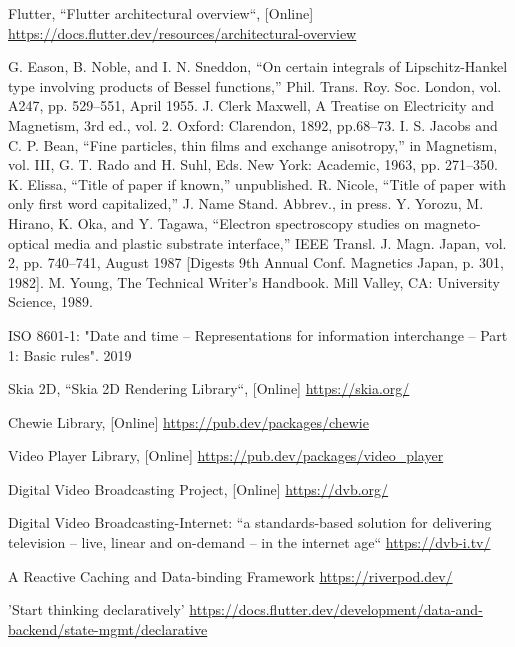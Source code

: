\documentclass[conference]{IEEEtran}
\begin{document}
\begin{thebibliography}{00}
 Flutter, ``Flutter architectural overview``, [Online] \url{https://docs.flutter.dev/resources/architectural-overview}
	
 G. Eason, B. Noble, and I. N. Sneddon, ``On certain integrals of Lipschitz-Hankel type involving products of Bessel functions,'' Phil. Trans. Roy. Soc. London, vol. A247, pp. 529--551, April 1955.
 J. Clerk Maxwell, A Treatise on Electricity and Magnetism, 3rd ed., vol. 2. Oxford: Clarendon, 1892, pp.68--73.
 I. S. Jacobs and C. P. Bean, ``Fine particles, thin films and exchange anisotropy,'' in Magnetism, vol. III, G. T. Rado and H. Suhl, Eds. New York: Academic, 1963, pp. 271--350.
 K. Elissa, ``Title of paper if known,'' unpublished.
 R. Nicole, ``Title of paper with only first word capitalized,'' J. Name Stand. Abbrev., in press.
 Y. Yorozu, M. Hirano, K. Oka, and Y. Tagawa, ``Electron spectroscopy studies on magneto-optical media and plastic substrate interface,'' IEEE Transl. J. Magn. Japan, vol. 2, pp. 740--741, August 1987 [Digests 9th Annual Conf. Magnetics Japan, p. 301, 1982].
 M. Young, The Technical Writer's Handbook. Mill Valley, CA: University Science, 1989.


 ISO 8601-1: "Date and time -- Representations for information interchange -- Part 1: Basic rules". 2019




 Skia 2D, ``Skia 2D Rendering Library``, [Online]
\url{https://skia.org/}

 Chewie Library, [Online] 
\url{https://pub.dev/packages/chewie}

 Video Player Library, [Online] 
\url{https://pub.dev/packages/video_player}


 Digital Video Broadcasting Project, [Online]
\url{https://dvb.org/}

 Digital Video Broadcasting-Internet: ``a standards-based solution for delivering television – live, linear and on-demand – in the internet age``
\url{https://dvb-i.tv/}

 A Reactive Caching and Data-binding Framework 
\url{https://riverpod.dev/}

 'Start thinking declaratively'
\url{https://docs.flutter.dev/development/data-and-backend/state-mgmt/declarative}




\end{thebibliography}
\end{document}
